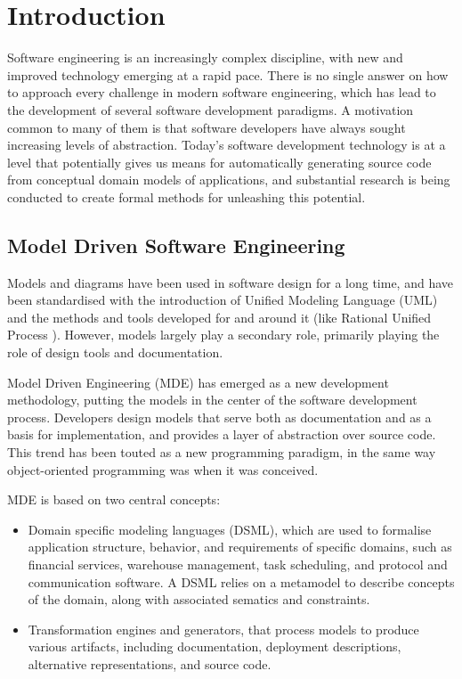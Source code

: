 \chapter{Introduction}
\label{chap:introduction}
 
Software engineering is an increasingly complex discipline, with
new and improved technology emerging at a rapid pace. There is no single answer
on how to approach every challenge in modern software engineering, which has
lead to the development of several software development paradigms. A motivation common to many of them is that
software developers have always sought increasing levels of abstraction.
Today's software development technology is at a level that potentially gives us
means for automatically generating source code from conceptual domain models of
applications, and substantial research is being conducted to create formal
methods for unleashing this potential.


\section{Model Driven Software Engineering}

Models and diagrams have been used in software design for a long time, and have
been standardised with the introduction of Unified Modeling Language (UML)
\cite{umlInfra} and the methods and tools developed for and around it (like
Rational Unified Process \cite{rup}).
However, models largely play a secondary role, primarily playing the role of
design tools and documentation.

Model Driven Engineering (MDE) \cite{kent2002model} has emerged as a new development
methodology, putting the models in the center of the software development process. Developers
design models that serve both as documentation and as a basis for
implementation, and provides a layer of abstraction over source code. This
trend has been touted as a new programming paradigm, in the same way
object-oriented programming was when it was conceived.

MDE is based on two central concepts:
\begin{itemize}
	\item Domain specific modeling languages (DSML), which are used to formalise
	application structure, behavior, and requirements of specific domains, such as
	financial services, warehouse management, task scheduling, and protocol and
	communication software. A DSML relies on a metamodel to describe concepts of
	the domain, along with associated sematics and constraints.
	\item Transformation engines and generators, that process models to produce
	various artifacts, including documentation, deployment descriptions,
	alternative representations, and source code.
\end{itemize}

